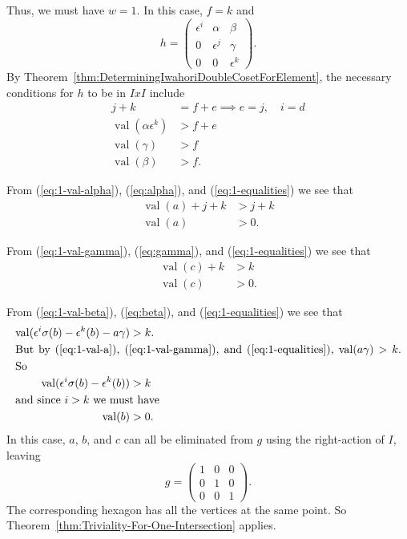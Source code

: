 \documentclass{amsart}
\theoremstyle{definition}
\def\e{\epsilon}
\def\val{\mathop{\mathrm{val}}}
\def\s{\sigma}
\begin{document}
  Thus, we must have $w = 1$.  In this case, $f = k$ and 
  \begin{equation*}
    h = \begin{pmatrix}
      \e^i & \alpha & \beta \\
      0 & \e^j & \gamma \\
      0 & 0 & \e^k    
    \end{pmatrix}.
  \end{equation*}
  By Theorem~\ref{thm:DeterminingIwahoriDoubleCosetForElement}, the necessary
  conditions for $h$ to be in $IxI$ include
  \begin{align}
    \label{eq:1-equalities}
    j + k &= f + e \implies e = j,\quad i = d \\
    \label{eq:1-val-alpha}
    \val(\alpha\e^k) &> f + e \\
    \label{eq:1-val-gamma}
    \val(\gamma) &> f \\
    \label{eq:1-val-beta}
    \val(\beta) &> f.
  \end{align}

  From (\ref{eq:1-val-alpha}), (\ref{eq:alpha}), and (\ref{eq:1-equalities}) we
  see that
  \begin{align}
    \val(a) + j + k &> j + k \nonumber \\
    \label{eq:1-val-a}
    \val(a) &> 0.
  \end{align}

  From (\ref{eq:1-val-gamma}), (\ref{eq:gamma}), and (\ref{eq:1-equalities}) we
  see that
  \begin{align}
    \val(c) + k &> k \nonumber \\
    \label{eq:1-val-c}
    \val(c) &> 0.
  \end{align}

  From (\ref{eq:1-val-beta}), (\ref{eq:beta}), and (\ref{eq:1-equalities}) we
  see that
  \begin{align}
    \val(\e^i\s(b) - \e^k(b) - a\gamma) &> k. \nonumber \\
    \noalign{\noindent But by (\ref{eq:1-val-a}), (\ref{eq:1-val-gamma}), and
    (\ref{eq:1-equalities}), $\val(a\gamma) > k$.  So}
    \val(\e^i\s(b) - \e^k(b)) &> k \nonumber \\
    \noalign{\noindent and since $i > k$ we must have}
    \val(b) &> 0.
  \end{align}
  In this case, $a$, $b$, and $c$ can all be eliminated from $g$ using the
  right-action of $I$, leaving
  \begin{equation*}
    g = \begin{pmatrix}
      1 & 0 & 0 \\
      0 & 1 & 0 \\
      0 & 0 & 1    
    \end{pmatrix}.
  \end{equation*}
  The corresponding hexagon has all the vertices at the same point.  So
  Theorem~\ref{thm:Triviality-For-One-Intersection} applies.
  
  
  
    
\end{document}
